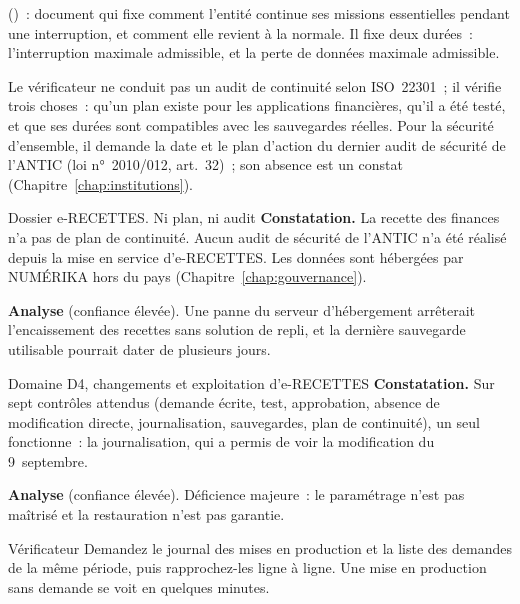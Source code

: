 \begin{boxdef}
()~: document qui fixe comment l'entité continue ses missions
essentielles pendant une interruption, et comment elle revient à la
normale. Il fixe deux durées~: l'interruption maximale admissible, et la
perte de données maximale admissible.
\end{boxdef}

Le vérificateur ne conduit pas un audit de continuité selon ISO~22301~;
il vérifie trois choses~: qu'un plan existe pour les applications
financières, qu'il a été testé, et que ses durées sont compatibles avec
les sauvegardes réelles. Pour la sécurité d'ensemble, il demande la date
et le plan d'action du dernier audit de sécurité de l'ANTIC (loi
n°~2010/012, art.~32)~; son absence est un constat
(Chapitre~\ref{chap:institutions}).

\begin{boxscenario}{Dossier e-RECETTES. Ni plan, ni audit}
\textbf{Constatation.} La recette des finances n'a pas de plan de
continuité. Aucun audit de sécurité de l'ANTIC n'a été réalisé depuis la
mise en service d'e-RECETTES. Les données sont hébergées par NUMÉRIKA
hors du pays (Chapitre~\ref{chap:gouvernance}).

\medskip
\textbf{Analyse} (confiance élevée). Une panne du serveur d'hébergement
arrêterait l'encaissement des recettes sans solution de repli, et la
dernière sauvegarde utilisable pourrait dater de plusieurs jours.
\end{boxscenario}

\separateur

\begin{boxlecture}{Domaine D4, changements et exploitation d'e-RECETTES}
\textbf{Constatation.} Sur sept contrôles attendus (demande écrite,
test, approbation, absence de modification directe, journalisation,
sauvegardes, plan de continuité), un seul fonctionne~: la
journalisation, qui a permis de voir la modification du 9~septembre.

\textbf{Analyse} (confiance élevée). Déficience majeure~: le
paramétrage n'est pas maîtrisé et la restauration n'est pas garantie.

\medskip
\hfill{}
\end{boxlecture}

\begin{boxmetier}{Vérificateur}
Demandez le journal des mises en production et la liste des demandes de
la même période, puis rapprochez-les ligne à ligne. Une mise en
production sans demande se voit en quelques minutes.
\end{boxmetier}

